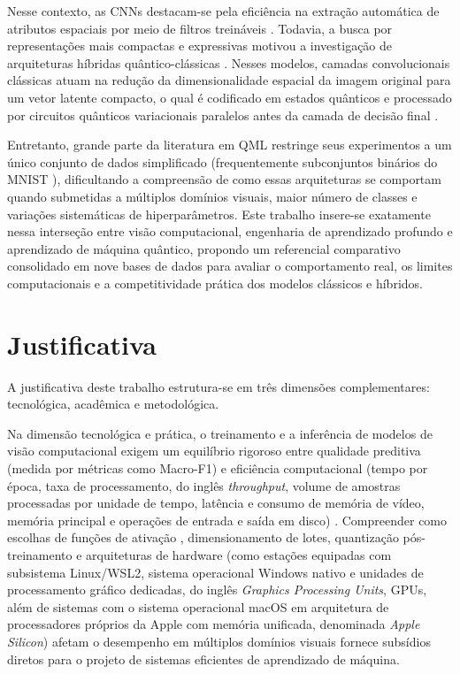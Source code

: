\documentclass[
    12pt,
    openright,
    oneside,
    a4paper,
    english,
    brazil
]{abntex2}
\begin{document}
Nesse contexto, as CNNs destacam-se pela eficiência na extração automática de atributos espaciais por meio de filtros treináveis \cite{LeCun2015,he2016resnet}. Todavia, a busca por representações mais compactas e expressivas motivou a investigação de arquiteturas híbridas quântico-clássicas \cite{henderson2020quanvolutional,cerezo2021variational,senokosov2024qml}. Nesses modelos, camadas convolucionais clássicas atuam na redução da dimensionalidade espacial da imagem original para um vetor latente compacto, o qual é codificado em estados quânticos e processado por circuitos quânticos variacionais paralelos antes da camada de decisão final \cite{bergholm2018pennylane,schuld2021effect,senokosov2024qml}.

Entretanto, grande parte da literatura em QML restringe seus experimentos a um único conjunto de dados simplificado (frequentemente subconjuntos binários do MNIST \cite{bokhan2022qcnn,long2025qcqcnn}), dificultando a compreensão de como essas arquiteturas se comportam quando submetidas a múltiplos domínios visuais, maior número de classes e variações sistemáticas de hiperparâmetros. Este trabalho insere-se exatamente nessa interseção entre visão computacional, engenharia de aprendizado profundo e aprendizado de máquina quântico, propondo um referencial comparativo consolidado em nove bases de dados para avaliar o comportamento real, os limites computacionais e a competitividade prática dos modelos clássicos e híbridos.

\section{Justificativa}

A justificativa deste trabalho estrutura-se em três dimensões complementares: tecnológica, acadêmica e metodológica.

Na dimensão tecnológica e prática, o treinamento e a inferência de modelos de visão computacional exigem um equilíbrio rigoroso entre qualidade preditiva (medida por métricas como Macro-F1) e eficiência computacional (tempo por época, taxa de processamento, do inglês \textit{throughput}, volume de amostras processadas por unidade de tempo, latência e consumo de memória de vídeo, memória principal e operações de entrada e saída em disco) \cite{faj2023warpspeed,chen2024quantumhpcworkflow}. Compreender como escolhas de funções de ativação \cite{nair2010relu,elfwing2018silu,ramachandran2017swish}, dimensionamento de lotes, quantização pós-treinamento \cite{zandieh2025turboquant} e arquiteturas de hardware (como estações equipadas com subsistema Linux/WSL2, sistema operacional Windows nativo e unidades de processamento gráfico dedicadas, do inglês \textit{Graphics Processing Units}, GPUs, além de sistemas com o sistema operacional macOS em arquitetura de processadores próprios da Apple com memória unificada, denominada \textit{Apple Silicon}) \cite{faj2023warpspeed,chen2024quantumhpcworkflow} afetam o desempenho em múltiplos domínios visuais fornece subsídios diretos para o projeto de sistemas eficientes de aprendizado de máquina.
\end{document}
